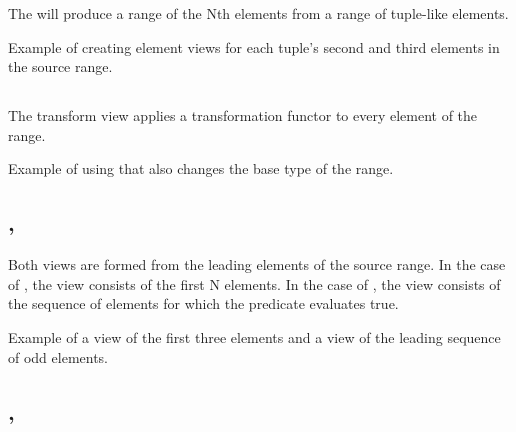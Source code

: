 The  will produce a range of the Nth elements from a range of tuple-like elements.

\begin{box-note}
\footnotesize Example of creating element views for each tuple's second and third elements in the source range.
\tcblower
{}
\end{box-note}

\subsection{\texorpdfstring{}{\texttt{std::views::transform}}}

The transform view applies a transformation functor to every element of the range.

\begin{box-note}
\footnotesize Example of using  that also changes the base type of the range.
\tcblower
{}
\end{box-note}

\subsection{\texorpdfstring{, }{\texttt{std::views::take}, \texttt{std::views::take\_while}}}

Both views are formed from the leading elements of the source range. In the case of , the view consists of the first N elements. In the case of , the view consists of the sequence of elements for which the predicate evaluates true.

\begin{box-note}
\footnotesize Example of a view of the first three elements and a view of the leading sequence of odd elements.
\tcblower
{}
\end{box-note}

\subsection{\texorpdfstring{, }{\texttt{std::views::drop}, \texttt{std::views::drop\_while}}}

